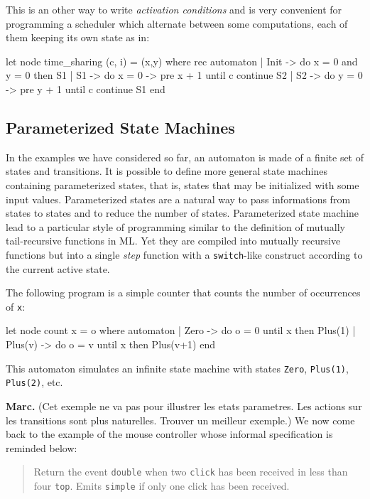 \documentclass[11pt,titlepage,twoside]{report}
\newcommand{\Marc}[1]{{\bf Marc.} ({#1})}
\begin{document}
This is an other way to write {\em activation conditions} and is very
convenient for programming a scheduler which alternate between some
computations, each of them keeping its own state as in:

\begin{runverbatim}
let node time_sharing (c, i) = (x,y) where
  rec automaton
      | Init ->
          do x = 0 and y = 0 then S1
      | S1 ->
          do x = 0 -> pre x + 1 until c continue S2
      | S2 ->
          do y = 0 -> pre y + 1 until c continue S1
      end
\end{runverbatim}

\subsection{Parameterized State Machines}
In the examples we have considered so far, an automaton is made of a
finite set of states and transitions. It is possible to define more
general state machines containing parameterized states, that is,
states that may be initialized with some input values. Parameterized
states are a natural way to pass informations from states to states
and to reduce the number of states. Parameterized state machine
lead to a particular style of programming similar to the
definition of mutually tail-recursive functions in ML. Yet they are
compiled into mutually recursive functions but into a single \emph{step}
function with a \texttt{switch}-like construct according to the current
active state.

The following program is a simple counter that counts the number of
occurrences of \verb-x-:

\begin{runverbatim}
let node count x = o where
  automaton
  | Zero -> do o = 0 until x then Plus(1)
  | Plus(v) -> do o = v until x then Plus(v+1)
  end
\end{runverbatim}

This automaton simulates an infinite state machine with states
\verb-Zero-, \verb-Plus(1)-, \verb-Plus(2)-, etc.

\Marc{Cet exemple ne va pas pour illustrer les etats parametres. Les
actions sur les transitions sont plus naturelles. Trouver un meilleur exemple.}
We now come back to the example of the mouse controller whose informal
specification is reminded below:

\begin{quote}
Return the event \verb-double- when two \verb-click- has been received
in less than four \verb-top-. Emits \verb-simple- if only one click
has been received.
\end{quote}
\end{document}
